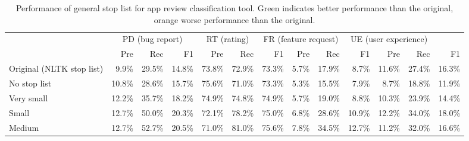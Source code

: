 \documentclass[conference]{IEEEtran}
\begin{document}
\begin{sloppy}
\begin{table}[]
\centering
\caption{Performance of general stop list for app review classification tool. Green indicates better performance than the original, orange worse performance than the original.}
\begin{tabular}{l|rrr|rrr|rrr|rrr}
\toprule
\multirow{2}{*}{}                                                                  & \multicolumn{3}{c}{PD (bug report)} & \multicolumn{2}{c}{RT (rating)} & \multicolumn{3}{c}{FR (feature request)} & \multicolumn{3}{c}{UE (user experience)} \\
                                                                                   & Pre        & Rec        & F1        & Pre            & Rec            & F1     & Pre         & Rec          & F1          & Pre          & Rec         & F1          \\
\midrule
Original (NLTK stop list) & 9.9\%      & 29.5\%     & 14.8\%    & 73.8\%         & 72.9\%         & 73.3\% & 5.7\%       & 17.9\%       & 8.7\%       & 11.6\%       & 27.4\%      & 16.3\%      \\
No stop list & \cellcolor{green}10.8\%     & \cellcolor{orange}28.6\%     & \cellcolor{green}15.7\%    & \cellcolor{green}75.6\%         & \cellcolor{orange}71.0\%         & 73.3\% & \cellcolor{orange}5.3\%       & \cellcolor{orange}15.5\%       & \cellcolor{orange}7.9\%       & \cellcolor{orange}8.7\%        & \cellcolor{orange}18.8\%      & \cellcolor{orange}11.9\%      \\
Very small                                                                         & \cellcolor{green}12.2\%     & \cellcolor{green}35.7\%     & \cellcolor{green}18.2\%    & \cellcolor{green}74.9\%         & \cellcolor{green}74.8\%         & \cellcolor{green}74.9\% & 5.7\%       & \cellcolor{green}19.0\%       & \cellcolor{green}8.8\%       & \cellcolor{orange}10.3\%       & \cellcolor{orange}23.9\%      & \cellcolor{orange}14.4\%      \\
Small                                                                              & \cellcolor{green}12.7\%     & \cellcolor{green}50.0\%     & \cellcolor{green}20.3\%    & \cellcolor{orange}72.1\%         & \cellcolor{green}78.2\%         & \cellcolor{green}75.0\% & \cellcolor{green}6.8\%       & \cellcolor{green}28.6\%       & \cellcolor{green}10.9\%      & \cellcolor{green}12.2\%       & \cellcolor{green}34.0\%      & \cellcolor{green}18.0\%      \\
Medium                                                                             & \cellcolor{green}12.7\%     & \cellcolor{green}52.7\%     & \cellcolor{green}20.5\%    & \cellcolor{orange}71.0\%         & \cellcolor{green}81.0\%         & \cellcolor{green}75.6\% & \cellcolor{green}7.8\%       & \cellcolor{green}34.5\%       & \cellcolor{green}12.7\%      & \cellcolor{orange}11.2\%       & \cellcolor{green}32.0\%      & \cellcolor{green}16.6\%      \\

\end{tabular}
\end{table}
\end{sloppy}
\end{document}
